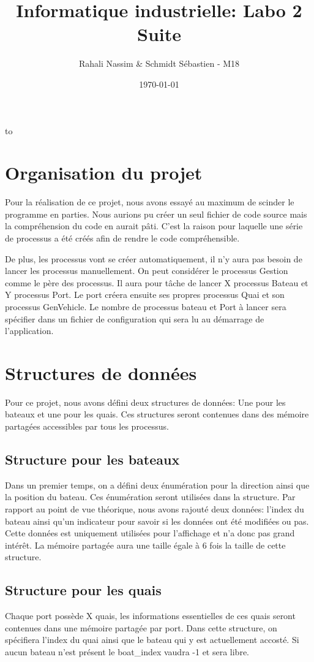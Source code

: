\documentclass[a4paper, 11pt]{article}
\date{\today}
\author{}
\title{}
\title{Informatique industrielle: Labo 2 Suite}
\author{Rahali Nassim \& Schmidt Sébastien -  M18}
\makeatletter
\def\clap#1{\hbox to 0pt{\hss #1\hss}}%
\def\haut#1#2#3{%
\hbox to \hsize{%
\rlap{\vtop{\raggedright #1}}%
\hss
\clap{\vtop{\centering #2}}%
\hss
\llap{\vtop{\raggedleft #3}}}}%
\def\bas#1#2#3{%
\hbox to \hsize{%
\rlap{\vbox{\raggedright #1}}%
\hss
\clap{\vbox{\centering #2}}%
\hss
\llap{\vbox{\raggedleft #3}}}}%
\def\maketitle{%
\thispagestyle{empty}\vbox to \vsize{%
\haut{}{\@blurb}{}
\vfill
\vspace{1cm}
\begin{flushleft}
\usefont{OT1}{ptm}{m}{n}
\huge \@title
\end{flushleft}
\par
\hrule height 4pt
\par
\begin{flushright}
\usefont{OT1}{phv}{m}{n}
\Large \@author
\par
\end{flushright}
\vspace{1cm}
\vfill
\vfill
\bas{}{\@location, le \@date}{}
}%
\cleardoublepage
}
\makeatother
\begin{document}
\maketitle

\tableofcontents
\newpage

\section{Organisation du projet}
	Pour la réalisation de ce projet, nous avons essayé au maximum de scinder le programme en parties. Nous aurions pu créer un seul fichier de code source mais la compréhension du code en aurait pâti. C'est la raison pour laquelle une série de processus a été créés afin de rendre le code compréhensible. 
	
	De plus, les processus vont se créer automatiquement, il n'y aura pas besoin de lancer les processus manuellement. On peut considérer le processus Gestion comme le père des processus. Il aura pour tâche de lancer X processus Bateau et Y processus Port. Le port créera ensuite ses propres processus Quai et son processus GenVehicle. Le nombre de processus bateau et Port à lancer sera spécifier dans un fichier de configuration qui sera lu au démarrage de l'application.
	
\section{Structures de données}
	Pour ce projet, nous avons défini deux structures de données: Une pour les bateaux et une pour les quais. Ces structures seront contenues dans des mémoire partagées accessibles par tous les processus.
	\subsection{Structure pour les bateaux} \label{struct_boat}
		
		Dans un premier temps, on a défini deux énumération pour la direction ainsi que la position du bateau. Ces énumération seront utilisées dans la structure. Par rapport au point de vue théorique, nous avons rajouté deux données: l'index du bateau ainsi qu'un indicateur pour savoir si les données ont été modifiées ou pas. Cette données est uniquement utilisées pour l'affichage et n'a donc pas grand intérêt. La mémoire partagée aura une taille égale à 6 fois la taille de cette structure.
	\subsection{Structure pour les quais}
		
		Chaque port possède X quais, les informations essentielles de ces quais seront contenues dans une mémoire partagée par port. Dans cette structure, on spécifiera l'index du quai ainsi que le bateau qui y est actuellement accosté. Si aucun bateau n'est présent le boat\_index vaudra -1 et sera libre.	
\end{document}
